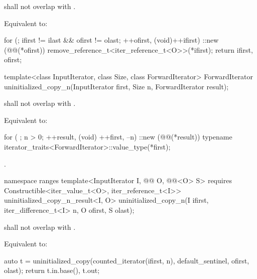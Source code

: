 \begin{itemdescr}
\pnum
\expects
{} shall not overlap with .

\pnum
\effects Equivalent to:
\begin{codeblock}
for (; ifirst != ilast && ofirst != olast; ++ofirst, (void)++ifirst) {
  ::new (@@(*ofirst)) remove_reference_t<iter_reference_t<O>>(*ifirst);
}
return {ifirst, ofirst};
\end{codeblock}
\end{itemdescr}

%
\begin{itemdecl}
template<class InputIterator, class Size, class ForwardIterator>
  ForwardIterator uninitialized_copy_n(InputIterator first, Size n, ForwardIterator result);
\end{itemdecl}

\begin{itemdescr}
\pnum
\expects
{} shall not overlap with .

\pnum
\effects
Equivalent to:
\begin{codeblock}
for ( ; n > 0; ++result, (void) ++first, --n) {
  ::new (@@(*result))
    typename iterator_traits<ForwardIterator>::value_type(*first);
}
\end{codeblock}

\pnum
\returns {}.
\end{itemdescr}

%
\begin{itemdecl}
namespace ranges {
  template<InputIterator I, @@ O, @@<O> S>
      requires Constructible<iter_value_t<O>, iter_reference_t<I>>
    uninitialized_copy_n_result<I, O>
      uninitialized_copy_n(I ifirst, iter_difference_t<I> n, O ofirst, S olast);
}
\end{itemdecl}

\begin{itemdescr}
\pnum
\expects
{} shall not overlap with
.

\pnum
\effects Equivalent to:
\begin{codeblock}
auto t = uninitialized_copy(counted_iterator(ifirst, n),
                            default_sentinel, ofirst, olast);
return {t.in.base(), t.out};
\end{codeblock}
\end{itemdescr}

